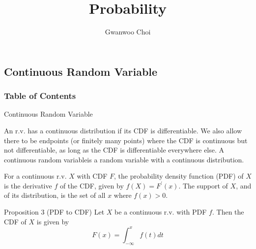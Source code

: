 \documentclass[8pt]{beamer}
\title{Probability}
\author{Gwanwoo Choi}
\begin{document}
\begin{frame}
    \titlepage
\end{frame}


\subsection{Continuous Random Variable}

\begin{frame}
    \frametitle{Table of Contents}
    \tableofcontents[currentsubsection]
\end{frame}


\begin{frame}{Continuous Random Variable}
    \begin{definition}[Continuous r.v.]
        An r.v. has a continuous distribution if its CDF is differentiable. We also allow there to be endpoints (or finitely many points) where the CDF is continuous but not differentiable, as long as the CDF is differentiable everywhere else. A continuous random variableis a random variable with a continuous distribution.
    \end{definition}

    \begin{definition}
        For a continuous r.v. $X$ with CDF $F$, the probability density function (PDF) of $X$ is the derivative $f$ of the CDF, given by $f(X) = F^\prime(x)$. The support of $X$, and of its distribution, is the set of all $x$ where $f(x)>0$.
    \end{definition}

    \begin{block}{Proposition 3 (PDF to CDF)}
        Let $X$ be a continuous r.v. with PDF $f$. Then the CDF of $X$ is given by 
        \[F(x) = \int^x_{- \infty} f(t) dt\]
    \end{block}

\end{frame}
\end{document}
